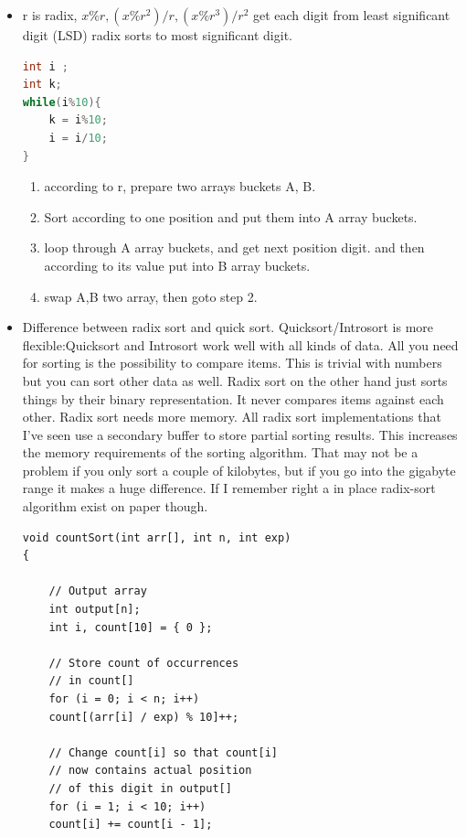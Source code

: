 \documentclass[a4paper,11pt,twoside]{book}
\begin{document}
\begin{itemize}
\item r is radix, $x\%r, (x\%r^{2})/r, (x\%r^{3})/r^{2}$  get each digit from least significant digit (LSD) radix sorts to most significant digit. 

\begin{lstlisting}[frame=single, language=c++]
int i ;
int k;
while(i%10){
	k = i%10;
	i = i/10;
}
\end{lstlisting}

\begin{enumerate}
\item according to r, prepare two arrays buckets A, B. 
\item Sort according to one position and put them into A array buckets. 
\item loop through A array buckets, and get next position digit. and then according to its value put into B array buckets.
\item swap A,B two array, then goto step 2.
\end{enumerate}

	\item Difference between radix sort and quick sort. Quicksort/Introsort is more flexible:Quicksort and Introsort work well with all kinds of data. All you need for sorting is the possibility to compare items. This is trivial with numbers but you can sort other data as well. Radix sort on the other hand just sorts things by their binary representation. It never compares items against each other. Radix sort needs more memory. All radix sort implementations that I've seen use a secondary buffer to store partial sorting results. This increases the memory requirements of the sorting algorithm. That may not be a problem if you only sort a couple of kilobytes, but if you go into the gigabyte range it makes a huge difference. If I remember right a in place radix-sort algorithm exist on paper though.
	
\begin{lstlisting}
void countSort(int arr[], int n, int exp)
{
	
	// Output array
	int output[n];
	int i, count[10] = { 0 };
	
	// Store count of occurrences
	// in count[]
	for (i = 0; i < n; i++)
	count[(arr[i] / exp) % 10]++;
	
	// Change count[i] so that count[i]
	// now contains actual position
	// of this digit in output[]
	for (i = 1; i < 10; i++)
	count[i] += count[i - 1];
	

\end{lstlisting}
\end{itemize}
\end{document}
